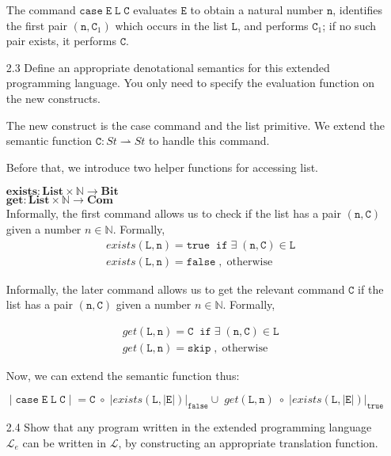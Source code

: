 \documentclass[a4paper,10pt]{article}
\newcommand{\E}{\mathtt{E}}
\newcommand{\C}{\mathtt{C}}
\newcommand{\LL}{\mathtt{L}}
\newcommand{\true}{\mathtt{true}}
\newcommand{\false}{\mathtt{false}}
\newcommand{\ifsym}{\mathtt{if}}
\newcommand{\skipsym}{\mathtt{skip}}
\newcommand{\case}{\mathtt{case}}
\newcommand{\question}[1]
{\color{DarkBlue}#1 \color{Black} \newline}
\begin{document}
\begin{enumerate}
{The command $\case \; \E \; \LL \; \C$ evaluates $\E$ to obtain a natural number $\mathtt{n}$,
identifies the first pair $(\mathtt{n},\C_1)$ which occurs in the list $\LL$, and performs $\C_1$;
if no such pair exists, it performs $\C$.
}

\question{
\item[2.3] Define an appropriate denotational semantics for this extended programming language. 
You only need to specify the evaluation function on the new constructs.
}

The new construct is the case command and the list primitive.
We extend the semantic function $\C : St \rightharpoonup St$ to handle this
command.

Before that, we introduce two helper functions for accessing list.

$\textbf{exists} : \textbf{List} \times \mathbb{N} \rightarrow \textbf{Bit}$ \\
$\textbf{get} : \textbf{List} \times \mathbb{N} \rightarrow \textbf{Com}$ \\ 

Informally, the first command allows us to check if the list has a pair
$(\mathtt{n},\C)$ given a number $n \in \mathbb{N}$. Formally,
\begin{align*}
& exists(\LL, \mathtt{n}) = \true  \; \; \ifsym \; \exists \; (\mathtt{n},\C)
\in
\LL
\\
& exists(\LL, \mathtt{n}) = \false \; , \; \text{otherwise} 
\end{align*}  

Informally, the later command allows us to get the relevant command $\C$ if the
list has a pair $(\mathtt{n},\C)$ given a number $n \in \mathbb{N}$. Formally,

\begin{align*}
& get(\LL, \mathtt{n}) = \C  \; \; \ifsym \; \exists \; (\mathtt{n},\C) \in
\LL
\\
& get(\LL, \mathtt{n}) = \skipsym \; , \; \text{otherwise} 
\end{align*}  

Now, we can extend the semantic function thus:

$\; | \; \case \; \E \; \LL \; \C \; |\; = 
\C \; \circ \; | exists(\LL, |\E|)|_{\false} \cup \; 
get(\LL, \mathtt{n}) \; \circ \; |exists(\LL, |\E|)|_{\true} $

\question{
\item[2.4] Show that any program written in the extended programming language $\mathcal{L}_e$ 
can be written in $\mathcal{L}$, by constructing an appropriate translation function.
}


\end{enumerate}
\end{document}
